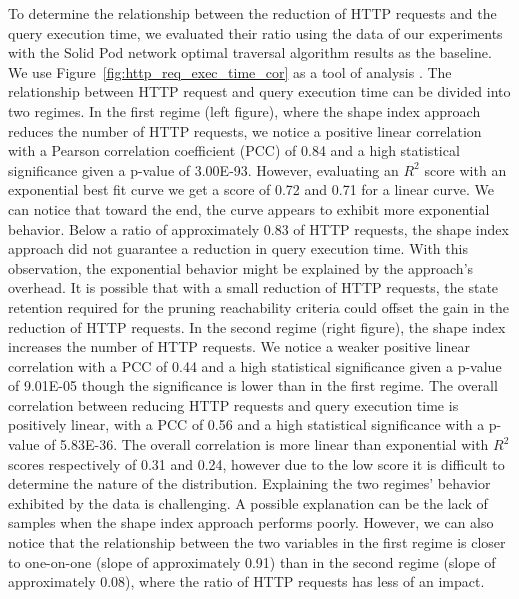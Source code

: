 To determine the relationship between the reduction of HTTP requests and the query execution time, we evaluated their ratio  using 
the data of our experiments with the Solid Pod network optimal traversal algorithm results as the baseline.
We use Figure~\ref{fig:http_req_exec_time_cor} as a tool of analysis .
The relationship between HTTP request and query execution time can be divided into two regimes.
In the first regime (left figure), where the shape index approach reduces the number of HTTP requests, we notice a positive linear correlation with a
Pearson correlation coefficient (PCC) of 0.84 and a high statistical significance given a p-value of 3.00E-93.
However, evaluating an $R^2$ score with an exponential best fit curve we get a score of 0.72 and 0.71 for a linear curve.
We can notice that toward the end, the curve appears to exhibit more exponential behavior.
Below a ratio of approximately 0.83 of HTTP requests, the shape index approach did not guarantee a reduction in query execution time.
With this observation, the exponential behavior might be explained by the approach's overhead. 
It is possible that with a small reduction of HTTP requests, the state retention required for the pruning reachability criteria could offset the gain in the reduction of HTTP requests.
In the second regime (right figure), the shape index increases the number of HTTP requests.
We notice a weaker positive linear correlation with a PCC of 0.44 and a high statistical significance given a p-value of 9.01E-05 though the significance is lower than in the first regime.
The overall correlation between reducing HTTP requests and query execution time is positively linear, with a PCC of 0.56 and a high statistical significance with a p-value of 5.83E-36.
The overall correlation is more linear than exponential with $R^2$ scores respectively of 0.31 and 0.24, however due to the low score it is difficult to determine the nature of the distribution.
Explaining the two regimes' behavior exhibited by the data is challenging.
A possible explanation can be the lack of samples when the shape index approach performs poorly.
However, we can also notice that the relationship between the two variables in the first regime is closer to one-on-one (slope of approximately 0.91) than in the second regime (slope of approximately 0.08), where the ratio of HTTP requests has less of an impact.
